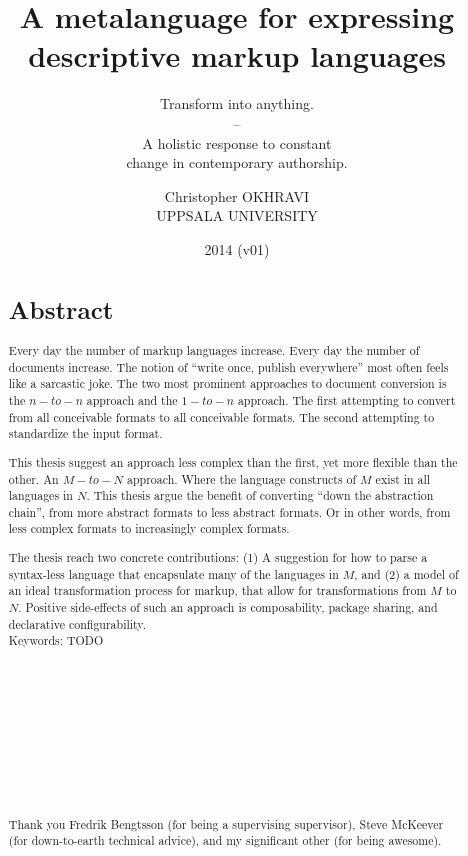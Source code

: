 \documentclass{scrreprt}
\date{2014 \smaller(v01)}
\title{ A metalanguage for expressing \\ descriptive markup languages }
\subtitle{Transform into anything. \\ -- \\ A holistic response to constant \\ change in contemporary authorship.}
\author{ Christopher OKHRAVI \\ UPPSALA UNIVERSITY }
\begin{document}
\maketitle






%
%
%
%
%
%


\begin{abstract}
\section*{Abstract}
Every day the number of markup languages increase. Every day the number of documents increase. The notion of ``write once, publish everywhere'' most often feels like a sarcastic joke. The two most prominent approaches to document conversion is the $n-to-n$ approach and the $1-to-n$ approach. The first attempting to convert from all conceivable formats to all conceivable formats. The second attempting to standardize the input format.

This thesis suggest an approach less complex than the first, yet more flexible than the other. An $M-to-N$ approach. Where the language constructs of $M$ exist in all languages in $N$. This thesis argue the benefit of converting ``down the abstraction chain'', from more abstract formats to less abstract formats. Or in other words, from less complex formats to increasingly complex formats.

The thesis reach two concrete contributions: (1) A suggestion for how to parse a syntax-less language that encapsulate many of the languages in $M$, and (2) a model of an ideal transformation process for markup, that allow for transformations from $M$ to $N$. Positive side-effects of such an approach is composability, package sharing, and declarative configurability. \\


Keywords: TODO  \\ \\ \\ \\ \\ \\ \\ \\ \\ \\


\smaller
\paragraph{}
\noindent Thank you Fredrik Bengtsson (for being a supervising supervisor), 
Steve McKeever (for down-to-earth technical advice),
and my significant other (for being awesome).
\end{abstract}
\end{document}
